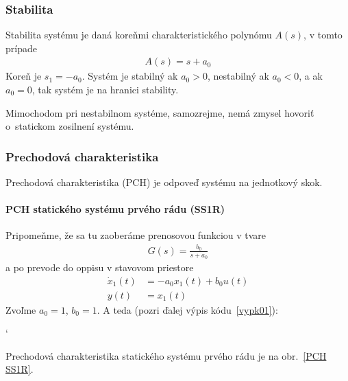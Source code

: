 \documentclass[a4paper, 10pt, ]{article}
\begin{document}
\subsubsection{Stabilita}

Stabilita systému je daná koreňmi charakteristického polynómu $A(s)$, v tomto prípade
\begin{align}
    A(s) = s + a_0
\end{align}
Koreň je $s_1 = -a_0$. Systém je stabilný ak $a_0 > 0$, nestabilný ak $a_0 < 0$, a ak $a_0 = 0$, tak systém je na hranici stability.

Mimochodom pri nestabilnom systéme, samozrejme, nemá zmysel hovoriť o~statickom zosilnení systému.


\subsubsection{Prechodová charakteristika}

Prechodová charakteristika (PCH) je odpoveď systému na jednotkový skok.


\paragraph{PCH statického systému prvého rádu (SS1R)}

Pripomeňme, že sa tu zaoberáme prenosovou funkciou v tvare
\begin{align} \label{typ1radtf2}
    G(s) = \frac{b_0}{s + a_0}
\end{align}
a po prevode do oppisu v stavovom priestore
\begin{align}
    \dot x_1(t) &= - a_0 x_1(t) + b_0 u(t) \\
    y(t) &= x_1(t)
\end{align}
Zvoľme $a_0 = 1$, $b_0 = 1$. A teda (pozri ďalej výpis kódu~\ref{vypk01}):
{\catcode`

}
\noindent

Prechodová charakteristika statického systému prvého rádu je na obr.~\ref{PCH SS1R}.

\begin{center}


	\label{PCH SS1R}

\end{center}
\end{document}
